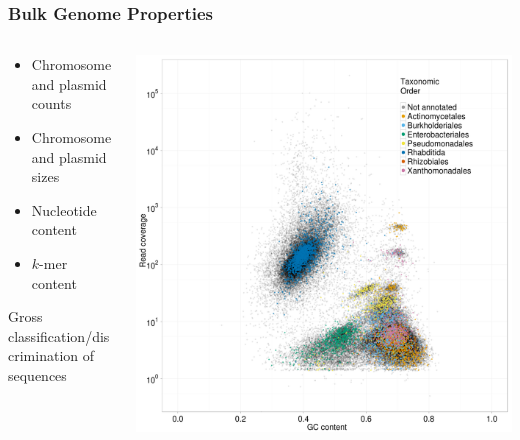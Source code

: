 \begin{frame}
  \frametitle{Bulk Genome Properties}
  \begin{columns}[T]
    \begin{column}{5cm}
      \begin{itemize}
        \item Chromosome and plasmid counts
        \item Chromosome and plasmid sizes
        \item Nucleotide content
        \item $k$-mer content
      \end{itemize}    
      Gross classification/discrimination of sequences\\
    \end{column}
    \begin{column}{5cm}
      \includegraphics[width=1\textwidth]{images/blobology}
    \end{column}
  \end{columns}
\end{frame}

